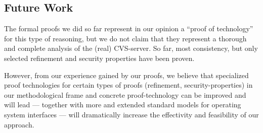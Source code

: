 \subsection{Future Work}
The formal proofs we did so far represent in our opinion a ``proof of
technology'' for this type of reasoning, but we do not claim that they represent
a thorough and complete analysis of the (real) CVS-server. So far, most
consistency, but only selected refinement and security properties have been proven.

However, from our experience gained by our proofs, we believe that specialized
proof technologies for certain types of proofs (refinement, security-properties)
in our methodological frame and concrete proof-technology can be improved and
will lead --- together with more and extended standard models for operating
system interfaces --- will dramatically increase the effectivity and feasibility
of our approach.


